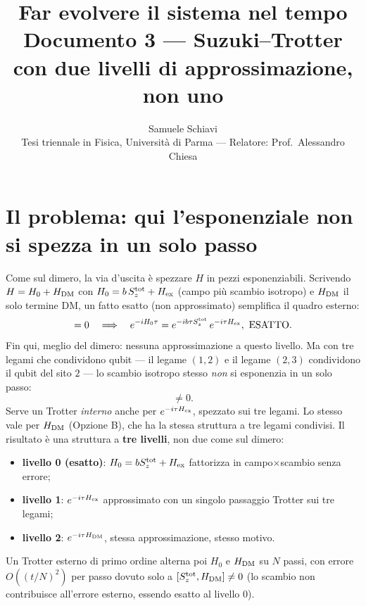 \documentclass[11pt,a4paper]{article}
\title{\bfseries Far evolvere il sistema nel tempo\\[2pt]
\large Documento 3 --- Suzuki--Trotter con due livelli di approssimazione, non uno}
\author{Samuele Schiavi \\ \small Tesi triennale in Fisica, Università di Parma
--- Relatore: Prof.\ Alessandro Chiesa}
\date{}
\begin{document}
\maketitle
\thispagestyle{fancy}

\section{Il problema: qui l'esponenziale non si spezza in un solo passo}

Come sul dimero, la via d'uscita è spezzare $H$ in pezzi esponenziabili.
Scrivendo $H=H_0+H_{\rm DM}$ con $H_0=b\,S_z^{\rm tot}+H_{\rm ex}$ (campo più
scambio isotropo) e $H_{\rm DM}$ il solo termine DM, un fatto esatto (non
approssimato) semplifica il quadro esterno:
\begin{equation}
[S_z^{\rm tot}, H_{\rm ex}] = 0 \quad\Longrightarrow\quad
e^{-iH_0\tau} = e^{-ib\tau S_z^{\rm tot}}\, e^{-i\tau H_{\rm ex}},\ \text{ESATTO}.
\end{equation}
Fin qui, meglio del dimero: nessuna approssimazione a questo livello. Ma con
tre legami che condividono qubit --- il legame $(1,2)$ e il legame $(2,3)$
condividono il qubit del sito $2$ --- lo scambio isotropo stesso
\emph{non} si esponenzia in un solo passo:
\begin{equation}
[\vec\sigma_1\!\cdot\!\vec\sigma_2,\ \vec\sigma_2\!\cdot\!\vec\sigma_3] \neq 0.
\end{equation}
Serve un Trotter \emph{interno} anche per $e^{-i\tau H_{\rm ex}}$, spezzato
sui tre legami. Lo stesso vale per $H_{\rm DM}$ (Opzione B), che ha la
stessa struttura a tre legami condivisi. Il risultato è una struttura a
\textbf{tre livelli}, non due come sul dimero:

\begin{itemize}[leftmargin=1.8em,itemsep=3pt]
\item \textbf{livello 0 (esatto)}: $H_0=b S_z^{\rm tot}+H_{\rm ex}$
fattorizza in campo$\times$scambio senza errore;
\item \textbf{livello 1}: $e^{-i\tau H_{\rm ex}}$ approssimato con un
singolo passaggio Trotter sui tre legami;
\item \textbf{livello 2}: $e^{-i\tau H_{\rm DM}}$, stessa approssimazione,
stesso motivo.
\end{itemize}
Un Trotter esterno di primo ordine alterna poi $H_0$ e $H_{\rm DM}$ su $N$
passi, con errore $O((t/N)^2)$ per passo dovuto solo a
$[S_z^{\rm tot},H_{\rm DM}]\neq0$ (lo scambio non contribuisce all'errore
esterno, essendo esatto al livello 0).
\end{document}
